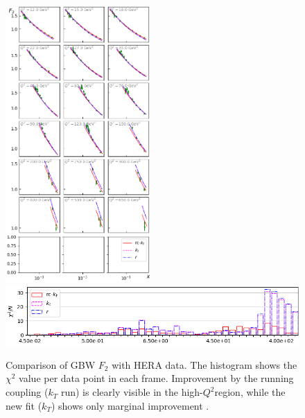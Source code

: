 \documentclass[11pt]{article}
\numberwithin{equation}{section}
\numberwithin{table}{section}
\numberwithin{figure}{section}
\begin{document}
\begin{figure}[p]
\includegraphics[width=0.49\textwidth,height=1.0\textwidth]{./plots/Figure_2.png}\\
\includegraphics[width=\textwidth,height=0.2\textwidth]{./plots/Figure_3.png}
\caption{Comparison of GBW $F_2$ with HERA data. The histogram shows the $\chi^2$ value per data point in each frame.
 Improvement by the running coupling ($k_T$ run) is clearly visible in the high-$Q^2$region, while the new fit ($k_T$) shows only marginal improvement .  }
\label{fig:GBW-Grid}
\end{figure}
\end{document}
